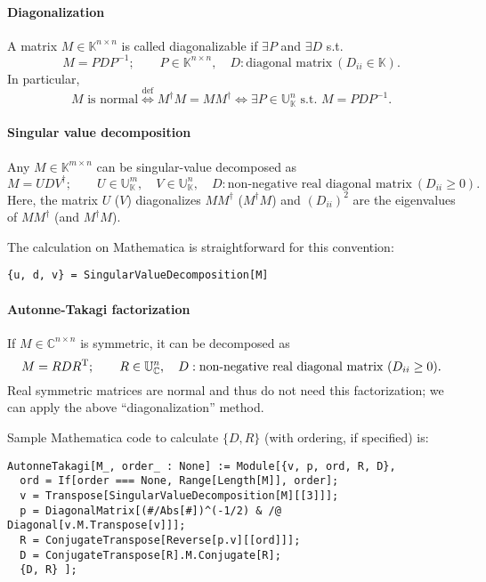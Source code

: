 \documentclass[CheatSheet]{subfiles}
\begin{document}
\paragraph{Diagonalization}
A matrix $M\in\mathbb K^{n\times n}$ is called diagonalizable if $\exists P$ and $\exists D$ s.t.
\begin{equation}
 M=PDP^{-1};\qquad
 P\in\mathbb{K}^{n\times n},\quad
 D:\text{diagonal matrix}~(D_{ii}\in\mathbb{K}).
\end{equation}
In particular,
\begin{equation}
 \text{$M$ is normal} \stackrel{\text{def}}\iff M^\dagger M = M M^\dagger \iff
 \exists P\in\mathbb{U}_{\mathbb K}^{n} \text{~s.t.~} M=PDP^{-1}.
\end{equation}


\paragraph{Singular value decomposition}
Any $M\in\mathbb{K}^{m\times n}$ can be singular-value decomposed as
\begin{equation}
 M=UDV^\dagger;\qquad
 U\in\mathbb{U}_{\mathbb K}^m,\quad
 V\in\mathbb{U}_{\mathbb K}^n,\quad
 D: \text{non-negative real diagonal matrix}~(D_{ii}\ge0).
\end{equation}
Here, the matrix $U$ ($V$) diagonalizes $MM^\dagger$ ($M^\dagger M$) and $(D_{ii})^2$ are the eigenvalues of $MM^\dagger$ (and $M^\dagger M$).

The calculation on Mathematica is straightforward for this convention:
\begin{verbatim}
{u, d, v} = SingularValueDecomposition[M]
\end{verbatim}




\paragraph{Autonne-Takagi factorization}
If $M\in\mathbb{C}^{n\times n}$ is symmetric, it can be decomposed as
\begin{equation}
 M=RDR^{\mathrm{T}};\qquad
 R\in\mathbb{U}_{\mathbb C}^n,\quad
 D: \text{non-negative real diagonal matrix}~(D_{ii}\ge0).
\end{equation}
Real symmetric matrices are normal and thus do not need this factorization; we can apply the above ``diagonalization'' method.

Sample Mathematica code to calculate $\{D,R\}$ (with ordering, if specified) is:
\begin{verbatim}
AutonneTakagi[M_, order_ : None] := Module[{v, p, ord, R, D},
  ord = If[order === None, Range[Length[M]], order];
  v = Transpose[SingularValueDecomposition[M][[3]]];
  p = DiagonalMatrix[(#/Abs[#])^(-1/2) & /@ Diagonal[v.M.Transpose[v]]];
  R = ConjugateTranspose[Reverse[p.v][[ord]]];
  D = ConjugateTranspose[R].M.Conjugate[R];
  {D, R} ];
\end{verbatim}
\end{document}
